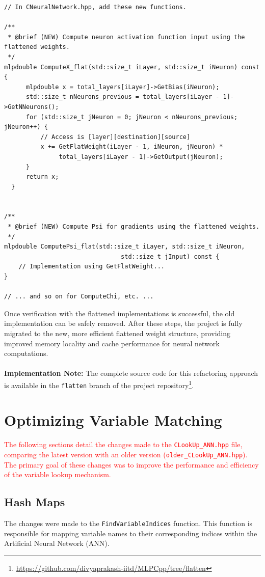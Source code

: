 \documentclass{article}
\newcommand{\tr}[1]{\textcolor{red}{#1}}
\begin{document}
\begin{verbatim}
// In CNeuralNetwork.hpp, add these new functions.

/**
 * @brief (NEW) Compute neuron activation function input using the flattened weights.
 */
mlpdouble ComputeX_flat(std::size_t iLayer, std::size_t iNeuron) const {
      mlpdouble x = total_layers[iLayer]->GetBias(iNeuron);
      std::size_t nNeurons_previous = total_layers[iLayer - 1]->GetNNeurons();
      for (std::size_t jNeuron = 0; jNeuron < nNeurons_previous; jNeuron++) {
          // Access is [layer][destination][source]
          x += GetFlatWeight(iLayer - 1, iNeuron, jNeuron) *
               total_layers[iLayer - 1]->GetOutput(jNeuron);
      }
      return x;
  }


/**
 * @brief (NEW) Compute Psi for gradients using the flattened weights.
 */
mlpdouble ComputePsi_flat(std::size_t iLayer, std::size_t iNeuron, 
                                std::size_t jInput) const { 
    // Implementation using GetFlatWeight...
}

// ... and so on for ComputeChi, etc. ...
\end{verbatim}


Once verification with the flattened implementations is successful, the old implementation can be safely removed. After these steps, the project is fully migrated to the new, more efficient flattened weight structure, providing improved memory locality and cache performance for neural network computations.
\\
\\
\noindent\textbf{Implementation Note:} The complete source code for this refactoring approach is available in the \texttt{flatten} branch of the project repository\footnote{\url{https://github.com/divyaprakash-iitd/MLPCpp/tree/flatten}}.

\section{Optimizing Variable Matching}
\tr{The following sections detail the changes made to the \texttt{CLookUp\_ANN.hpp} file, comparing the latest version with an older version (\texttt{older\_CLookUp\_ANN.hpp}). The primary goal of these changes was to improve the performance and efficiency of the variable lookup mechanism.}

\subsection{Hash Maps}
The changes were made to the \texttt{FindVariableIndices} function. This function is responsible for mapping variable names to their corresponding indices within the Artificial Neural Network (ANN).
\end{document}
